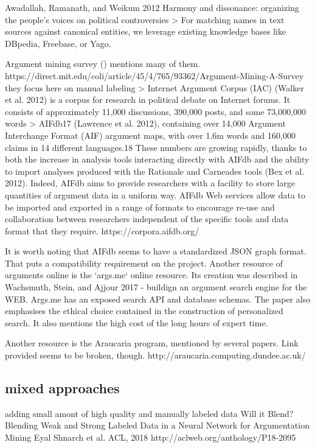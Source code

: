 \documentclass{article}
\begin{document}
Awadallah, Ramanath, and Weikum 2012 Harmony and dissonance: organizing the people's voices on political controversies
> For matching names in text sources against canonical entities, we leverage existing knowledge bases like DBpedia, Freebase, or Yago.

Argument mining survey () mentions many of them.
https://direct.mit.edu/coli/article/45/4/765/93362/Argument-Mining-A-Survey
they focus here on manual labeling
> Internet Argument Corpus (IAC) (Walker et al. 2012) is a corpus for research in political debate on Internet forums. It consists of approximately 11,000 discussions, 390,000 posts, and some 73,000,000 words
> AIFdb17 (Lawrence et al. 2012), containing over 14,000 Argument Interchange Format (AIF) argument maps, with over 1.6m words and 160,000 claims in 14 different languages.18 These numbers are growing rapidly, thanks to both the increase in analysis tools interacting directly with AIFdb and the ability to import analyses produced with the Rationale and Carneades tools (Bex et al. 2012). Indeed, AIFdb aims to provide researchers with a facility to store large quantities of argument data in a uniform way. AIFdb Web services allow data to be imported and exported in a range of formats to encourage re-use and collaboration between researchers independent of the specific tools and data format that they require.
https://corpora.aifdb.org/

It is worth noting that AIFdb seems to have a standardized JSON graph format. That puts a compatibility requirement on the project. 
Another resource of arguments online is the `args.me` online resource. 
Its creation was described in Wachsmuth, Stein, and Ajjour 2017 - buildign an argument search engine for the WEB.
Args.me has an exposed search API and database schemas. The paper also emphasises the ethical choice contained in the construction of personalized search.
It also mentions the high cost of the long hours of expert time.

Another resource is the Araucaria program, mentioned by several papers. Link provided seems to be broken, though. http://araucaria.computing.dundee.ac.uk/

\subsection{mixed approaches}

adding small amont of high quality and manually labeled data
Will it Blend? Blending Weak and Strong Labeled Data in a Neural Network for Argumentation Mining Eyal Shnarch et al.
ACL, 2018 http://aclweb.org/anthology/P18-2095
\end{document}
